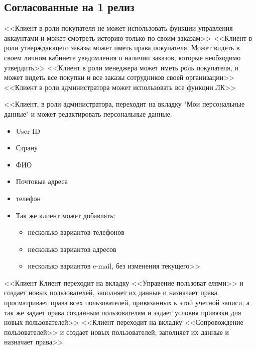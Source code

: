 \subsection{Согласованные на 1 релиз}
{
<<Клиент в роли покупателя не может использовать функции управления аккаунтами и может смотреть историю только по своим заказам>>
}
{
<<Клиент в роли утверждающего заказы может иметь права покупателя. Может видеть в своем личном кабинете уведомления о наличии заказов, которые необходимо утвердить>>
}
{
<<Клиент в роли менеджера может иметь роль покупателя, и может видеть все покупки и все заказы сотрудников своей организации>>
}
{
<<Клиент в роли администратора может использовать все функции ЛК>>
}
{
<<Клиент, в роли администратора, переходит на вкладку "Мои персональные данные" и может редактировать персональные данные:
\begin{itemize}
	\item User ID
	\item Страну
	\item ФИО
	\item Почтовые адреса
	\item телефон
	\item Так же клиент может добавлять:
		\begin{itemize}
		\item несколько вариантов телефонов
		\item несколько вариантов адресов
		\item несколько вариантов e-mail, без изменения текущего>>
		\end{itemize}
\end{itemize}
}
{
<<Клиент Клиент переходит на вкладку <<Управение пользоват елями>> и создает новых пользователей, заполняет их данные и назначает права. просматривает права всех пользователей, привязанных к этой учетной записи, а так же задает права созданным пользователям и задает условия привязки для новых пользователей>>
}
{
<<Клиент переходит на вкладку <<Сопровождение пользователей>> и создает новых пользователей, заполняет их данные и назначает права>>
}
